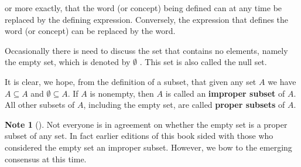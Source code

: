 \documentclass[10pt,]{book}
\newcommand{\terminology}[1]{\textbf{#1}}
\theoremstyle{plain}
\theoremstyle{definition}
\theoremstyle{definition}
\newtheorem{note}[theorem]{Note}
\theoremstyle{definition}
\theoremstyle{definition}
\numberwithin{equation}{section}
\begin{document}
or more exactly, that the word (or concept) being defined can at any time be replaced by the defining expression. Conversely, the expression that
defines the word (or concept) can be replaced by the word. %
\par
Occasionally there is need to discuss the set that contains no elements, namely the empty set, which is denoted by \(\emptyset\)\label{notation-5}
.
This set is also called the null set.%
\par
It is clear, we hope, from the definition of a subset, that given any set \( A\) we have \(A\subseteq A\) and \(\emptyset \subseteq A\). If \(A\) is nonempty, then 
 \(A\) is called an \terminology{improper subset} of \(A\).  All other subsets of \(A\), including the empty set, are called \terminology{proper subsets } of \(A\). %
\begin{note}[]\label{note-1}
Not everyone is in agreement on whether the empty set is a proper subset of any set.  In fact earlier editions of this book sided with those who considered the empty set an improper subset.  However, we bow to the emerging consensus at this time.%
\end{note}
\typeout{************************************************}
\typeout{************************************************}
\end{document}
